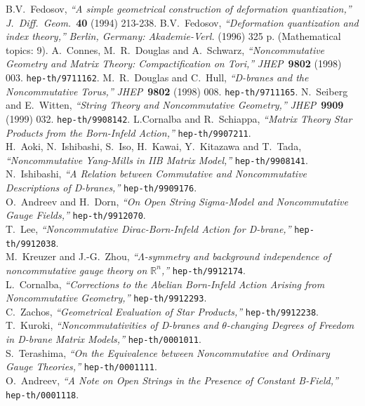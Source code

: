 \documentclass[10pt,a4paper]{article}
\begin{document}
\begin{thebibliography}{99}
B.V.~Fedosov,
{\it ``A simple geometrical construction of deformation quantization,''}
{\sl J.~Diff.~Geom.}~{\bf 40} (1994) 213-238.
B.V.~Fedosov,
{\it ``Deformation quantization and index theory,''}
{\sl  Berlin, Germany: Akademie-Verl.} (1996) 325 p. (Mathematical topics: 9).
A.~Connes, M.~R.~Douglas and A.~Schwarz,
{\it ``Noncommutative Geometry and Matrix Theory: Compactification on Tori,''}
{\sl JHEP}~{\bf 9802} (1998) 003. {\tt hep-th/9711162}.
M.~R.~Douglas and C.~Hull,
{\it ``D-branes and the Noncommutative Torus,''}
{\sl JHEP}~{\bf 9802} (1998) 008.
{\tt hep-th/9711165}.
N.~Seiberg and E.~Witten,
{\it ``String Theory and Noncommutative Geometry,''}
{\sl JHEP}~{\bf 9909} (1999) 032. {\tt hep-th/9908142}.
L.Cornalba and R.~Schiappa,
{\it ``Matrix Theory Star Products from the Born-Infeld Action,''}
{\tt hep-th/9907211}.\\
H.~Aoki, N.~Ishibashi, S.~Iso, H.~Kawai, Y.~Kitazawa and T.~Tada,
{\it ``Noncommutative Yang-Mills in IIB Matrix Model,''}
{\tt hep-th/9908141}.\\
N.~Ishibashi,
{\it ``A Relation between Commutative and Noncommutative Descriptions of D-branes,''}
{\tt hep-th/9909176}.\\
O.~Andreev and H.~Dorn,
{\it ``On Open String Sigma-Model and Noncommutative Gauge Fields,''}
{\tt hep-th/9912070}.\\
T.~Lee,
{\it ``Noncommutative Dirac-Born-Infeld Action for D-brane,''}
{\tt hep-th/9912038}.\\
M.~Kreuzer and J.-G.~Zhou,
{\it ``$\Lambda$-symmetry and background independence of noncommutative gauge theory on $\mathbb R^n$,''}
{\tt hep-th/9912174}.\\
L.~Cornalba,
{\it ``Corrections to the Abelian Born-Infeld Action Arising from Noncommutative Geometry,''}
{\tt hep-th/9912293}.\\
C.~Zachos,
{\it ``Geometrical Evaluation of Star Products,''}
{\tt hep-th/9912238}.\\
T.~Kuroki,
{\it ``Noncommutativities of D-branes and $\theta$-changing Degrees of Freedom in D-brane Matrix Models,''}
{\tt hep-th/0001011}.\\
S.~Terashima,
{\it ``On the Equivalence between Noncommutative and Ordinary Gauge Theories,''}
{\tt hep-th/0001111}.\\
O.~Andreev,
{\it ``A Note on Open Strings in the Presence of Constant B-Field,''}
{\tt hep-th/0001118}.\\

\end{thebibliography}
\end{document}
